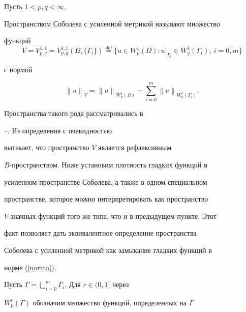 \begin{defnnonum}


Пусть $1<p, q<\infty$.


Пространством Соболева с усиленной метрикой называют множество


функций $$


V=V_{p,q}^{1,1}=V_{p,q}^{1,1}(\Omega, \{\Gamma_i\})


\overset{\mathrm{def}}{=}{} \{u \in W_p^1(\Omega):


{u}|_{\Gamma_i} \in W_q^1(\Gamma_i), \ i=\overline{0,m} \}


$$


с нормой


\begin{equation}


{\left\| {u} \right\|}_V=


{\left\| {u} \right\|}_{W_p^1(\Omega)}+\sum \limits_{i=0}^{m}


{\left\| {u} \right\|}_{W_q^1(\Gamma_i)}. \label{norma}


\end{equation}


\end{defnnonum}





Пространства такого рода рассматривались в 


\cite{Anton}--\cite{DjakIzVuz}. Из определения с очевидностью


вытекает, что пространство $V$ является рефлексивным


$B$-пространством. Ниже установим плотность гладких функций в


усиленном пространстве Соболева, а также в одном специальном


пространстве, которое можно интерпретировать как пространство


$V$-значных функций того же типа, что и в предыдущем пункте. Этот


факт позволяет дать эквивалентное определение пространства


Соболева с усиленной метрикой как замыкание гладких функций в


норме (\ref{norma}).





Пусть $\Gamma=\bigcup \limits_{i=0}^{m} \Gamma_i$. Для $r \in (0,1]$ через


$W_p^r(\Gamma)$ обозначим множество функций, определенных на $\Gamma$


